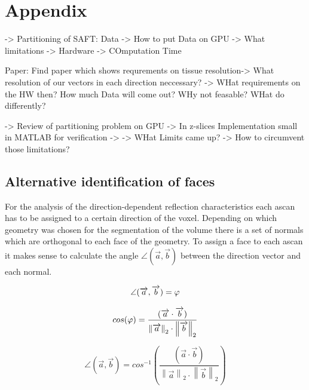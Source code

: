 \chapter{Appendix}
\label{app:appendix}




-> Partitioning of SAFT: Data -> How to put Data on GPU -> What limitations -> Hardware -> COmputation Time

Paper: Find paper which shows requrements on tissue resolution-> What resolution of our vectors in each direction neccessary? -> WHat requirements on the HW then?
How much Data will come out?
WHy not feasable? WHat do differently?

-> Review of partitioning problem on GPU  -> In z-slices
Implementation small in MATLAB for verification
->
-> WHat Limits came up?
-> How to circumvent those limitations?








\section{Alternative identification of faces}
For the analysis of the direction-dependent reflection characteristics each \ac{ascan} has to be assigned to a certain direction of the voxel.
Depending on which geometry was chosen for the segmentation of the volume there is a set of normals which are orthogonal to each face of the geometry. To assign a face to each \ac{ascan} it makes sense to calculate the angle $\angle (\overrightarrow{a},\overrightarrow{b})$ between the direction vector and each normal.


\begin{equation}
\centering
\angle (\overrightarrow{a},\overrightarrow{b}) = \varphi
\label{eqation_angle}
\end{equation}


\begin{equation}
\centering
cos(\varphi )  =   \frac{(\overrightarrow{a} \cdot \overrightarrow{b})}{\left \| \overrightarrow{a} \right \|_2  \cdot \left \| \overrightarrow{b} \right \|_2}
\label{eqation_cos_phi}
\end{equation}

\begin{equation}
\angle (\overrightarrow{a},\overrightarrow{b}) = 
cos^{-1} \left (  
\frac{(\overrightarrow{a} \cdot \overrightarrow{b})}{\left \| \overrightarrow{a} \right \|_2  \cdot \left \| \overrightarrow{b} \right \|_2} 
\right )
\label{eqation_angle_final}
\end{equation}

